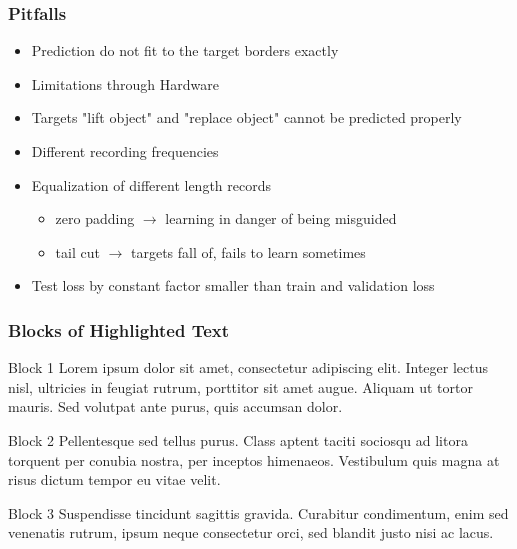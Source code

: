 \documentclass{beamer}
\begin{document}
\begin{frame}
	\frametitle{Pitfalls}
	\begin{itemize}
		\item Prediction do not fit to the target borders exactly
		\item Limitations through Hardware
		\item Targets "lift object" and "replace object" cannot be predicted properly
        \item Different recording frequencies
        \item Equalization of different length records
        \begin{itemize}
            \item zero padding $\rightarrow$ learning in danger of being misguided
            \item tail cut $\rightarrow$ targets fall of, fails to learn sometimes
        \end{itemize}
        \item Test loss by constant factor smaller than train and validation loss
	\end{itemize}
\end{frame}


\begin{frame}
\frametitle{Blocks of Highlighted Text}
\begin{block}{Block 1}
Lorem ipsum dolor sit amet, consectetur adipiscing elit. Integer lectus nisl, ultricies in feugiat rutrum, porttitor sit amet augue. Aliquam ut tortor mauris. Sed volutpat ante purus, quis accumsan dolor.
\end{block}

\begin{block}{Block 2}
Pellentesque sed tellus purus. Class aptent taciti sociosqu ad litora torquent per conubia nostra, per inceptos himenaeos. Vestibulum quis magna at risus dictum tempor eu vitae velit.
\end{block}

\begin{block}{Block 3}
Suspendisse tincidunt sagittis gravida. Curabitur condimentum, enim sed venenatis rutrum, ipsum neque consectetur orci, sed blandit justo nisi ac lacus.
\end{block}
\end{frame}

\end{document}
